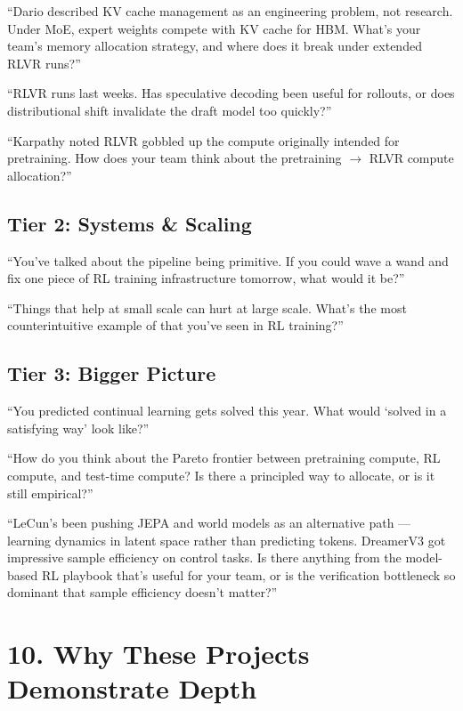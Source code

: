 ``Dario described KV cache management as an engineering problem, not research. Under MoE, expert weights compete with KV cache for HBM. What's your team's memory allocation strategy, and where does it break under extended RLVR runs?''

``RLVR runs last weeks. Has speculative decoding been useful for rollouts, or does distributional shift invalidate the draft model too quickly?''

``Karpathy noted RLVR gobbled up the compute originally intended for pretraining. How does your team think about the pretraining $\to$ RLVR compute allocation?''

\subsection{Tier 2: Systems \& Scaling}

``You've talked about the pipeline being primitive. If you could wave a wand and fix one piece of RL training infrastructure tomorrow, what would it be?''

``Things that help at small scale can hurt at large scale. What's the most counterintuitive example of that you've seen in RL training?''

\subsection{Tier 3: Bigger Picture}

``You predicted continual learning gets solved this year. What would `solved in a satisfying way' look like?''

``How do you think about the Pareto frontier between pretraining compute, RL compute, and test-time compute? Is there a principled way to allocate, or is it still empirical?''

``LeCun's been pushing JEPA and world models as an alternative path --- learning dynamics in latent space rather than predicting tokens. DreamerV3 got impressive sample efficiency on control tasks. Is there anything from the model-based RL playbook that's useful for your team, or is the verification bottleneck so dominant that sample efficiency doesn't matter?''

\section{10. Why These Projects Demonstrate Depth}


